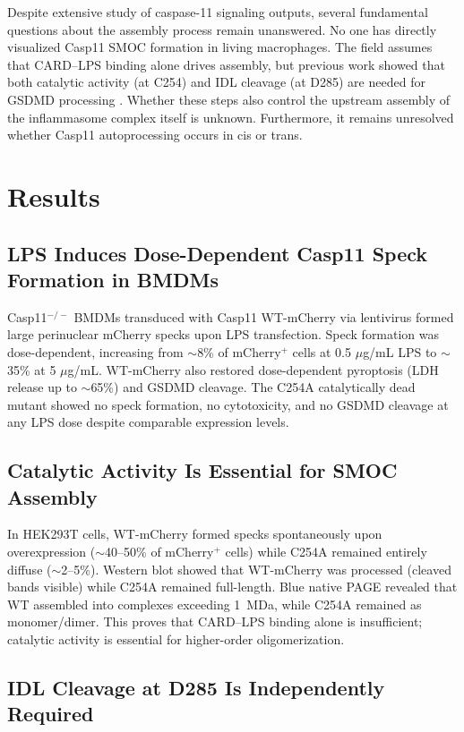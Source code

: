 \documentclass[11pt]{article}
\begin{document}
Despite extensive study of caspase-11 signaling outputs, several fundamental questions about the assembly process remain unanswered. No one has directly visualized Casp11 SMOC formation in living macrophages. The field assumes that CARD--LPS binding alone drives assembly, but previous work showed that both catalytic activity (at C254) and IDL cleavage (at D285) are needed for GSDMD processing \citep{ross2018dimerization}. Whether these steps also control the upstream assembly of the inflammasome complex itself is unknown. Furthermore, it remains unresolved whether Casp11 autoprocessing occurs in cis or trans.

\section{Results}

\subsection{LPS Induces Dose-Dependent Casp11 Speck Formation in BMDMs}

Casp11$^{-/-}$ BMDMs transduced with Casp11 WT-mCherry via lentivirus formed large perinuclear mCherry specks upon LPS transfection. Speck formation was dose-dependent, increasing from $\sim$8\% of mCherry$^+$ cells at 0.5 $\mu$g/mL LPS to $\sim$35\% at 5 $\mu$g/mL. WT-mCherry also restored dose-dependent pyroptosis (LDH release up to $\sim$65\%) and GSDMD cleavage. The C254A catalytically dead mutant showed no speck formation, no cytotoxicity, and no GSDMD cleavage at any LPS dose despite comparable expression levels.

\subsection{Catalytic Activity Is Essential for SMOC Assembly}

In HEK293T cells, WT-mCherry formed specks spontaneously upon overexpression ($\sim$40--50\% of mCherry$^+$ cells) while C254A remained entirely diffuse ($\sim$2--5\%). Western blot showed that WT-mCherry was processed (cleaved bands visible) while C254A remained full-length. Blue native PAGE revealed that WT assembled into complexes exceeding 1~MDa, while C254A remained as monomer/dimer. This proves that CARD--LPS binding alone is insufficient; catalytic activity is essential for higher-order oligomerization.

\subsection{IDL Cleavage at D285 Is Independently Required}
\end{document}
